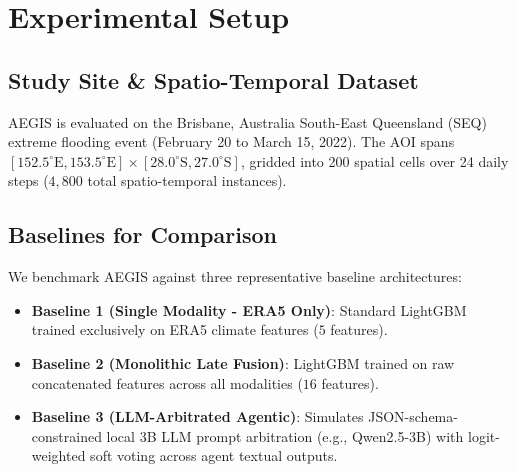 \section{Experimental Setup}
\label{sec:experimental_setup}

\subsection{Study Site \& Spatio-Temporal Dataset}
AEGIS is evaluated on the Brisbane, Australia South-East Queensland (SEQ) extreme flooding event (February 20 to March 15, 2022). The AOI spans $[152.5^\circ\text{E}, 153.5^\circ\text{E}] \times [28.0^\circ\text{S}, 27.0^\circ\text{S}]$, gridded into 200 spatial cells over 24 daily steps ($4,800$ total spatio-temporal instances).

\subsection{Baselines for Comparison}
We benchmark AEGIS against three representative baseline architectures:
\begin{itemize}
    \item \textbf{Baseline 1 (Single Modality - ERA5 Only)}: Standard LightGBM trained exclusively on ERA5 climate features ($5$ features).
    \item \textbf{Baseline 2 (Monolithic Late Fusion)}: LightGBM trained on raw concatenated features across all modalities ($16$ features).
    \item \textbf{Baseline 3 (LLM-Arbitrated Agentic)}: Simulates JSON-schema-constrained local 3B LLM prompt arbitration (e.g., Qwen2.5-3B) with logit-weighted soft voting across agent textual outputs.
\end{itemize}
